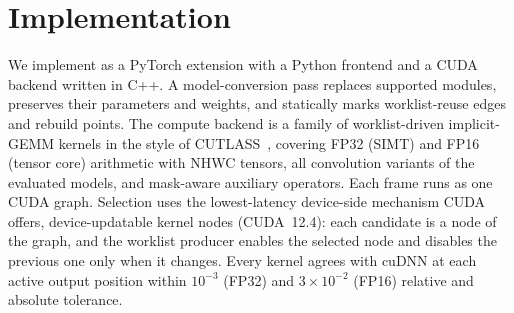 \section{Implementation}
\label{sec:impl}

We implement \sysname as a PyTorch extension with a Python frontend and a CUDA
backend written in C++. A model-conversion pass replaces supported modules,
preserves their parameters and weights, and statically marks worklist-reuse
edges and rebuild points. The compute backend is a family of worklist-driven
implicit-GEMM kernels in the style of CUTLASS~\cite{cutlass}, covering FP32
(SIMT) and FP16 (tensor core) arithmetic with NHWC tensors, all convolution
variants of the evaluated models, and mask-aware auxiliary operators. Each
frame runs as one CUDA graph. Selection uses the lowest-latency device-side
mechanism CUDA offers, device-updatable kernel nodes (CUDA~12.4):
each candidate is a node of the graph, and the worklist producer enables the selected node and disables the previous one only when it changes.
Every kernel agrees with cuDNN at each active output position within
$10^{-3}$ (FP32) and $3\times10^{-2}$ (FP16) relative and absolute tolerance.

